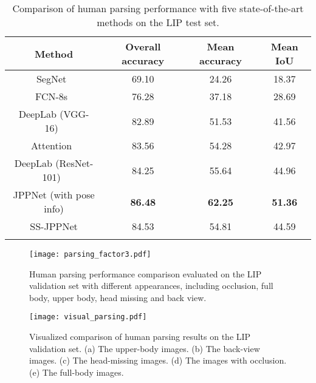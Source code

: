 \documentclass[10pt,journal,compsoc]{IEEEtran}
\begin{document}
\begin{table}[t]
\centering
\scriptsize
\caption{Comparison of human parsing performance with five state-of-the-art methods on the LIP test set.}
\vspace{-3mm}
\label{tab: lip_test}
\begin{tabular}{cccc}
\toprule[0.7pt]
   Method                                       & Overall accuracy & Mean accuracy   & Mean IoU  \\ \hline 
   SegNet~\cite{badrinarayanan2015segnet}       & 69.10            & 24.26           & 18.37    \\
   FCN-8s~\cite{long2014fully}                  & 76.28            & 37.18           & 28.69    \\
   DeepLab (VGG-16)~\cite{chen2016deeplab}      & 82.89            & 51.53           & 41.56    \\
   Attention~\cite{chen2015attention}           & 83.56            & 54.28           & 42.97    \\ 
   DeepLab (ResNet-101)~\cite{chen2016deeplab}  & 84.25            & 55.64           & 44.96    \\    \hline
   JPPNet {(with pose info)}           & \textbf{86.48}   & \textbf{62.25}  & \textbf{51.36}       \\
   SS-JPPNet                                    & 84.53            & 54.81           & 44.59    \\
\toprule[0.7pt]
\vspace{-4mm}
\end{tabular}
\end{table}


\begin{figure}[t]
\centering
   \texttt{[image: parsing\_factor3.pdf]}
\vspace{-8mm}
\caption{Human parsing performance comparison evaluated on the LIP validation set with different appearances, including occlusion, full body, upper body, head missing and back view.}
\vspace{-2mm}
\label{fig: analysis_val}
\end{figure}



\begin{figure*}[t]
\centering
\texttt{[image: visual\_parsing.pdf]}
\vspace{-4mm}
\caption{Visualized comparison of human parsing results on the LIP validation set. (a) The upper-body images. (b) The back-view images. (c) The head-missing images. (d) The images with occlusion. (e) The full-body images.}
\vspace{-2mm}
\label{fig:comparison}
\end{figure*}
\end{document}
